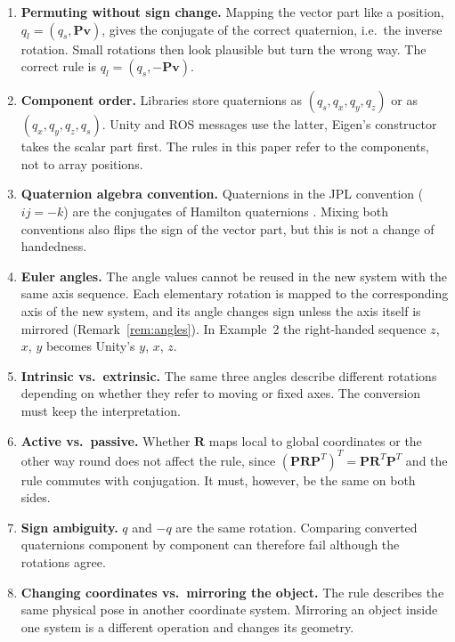 \documentclass{article}
\theoremstyle{plain}
\theoremstyle{definition}
\newcommand{\vect}[1]{\boldsymbol{#1}}
\begin{document}
\begin{enumerate}
  \item \textbf{Permuting without sign change.} Mapping the vector part like a position,
        $q_l = (q_s, \vect P\vect v)$, gives the conjugate of the correct quaternion, i.e.\ the
        inverse rotation. Small rotations then look plausible but turn the wrong way. The correct
        rule is $q_l = (q_s, -\vect P\vect v)$.
  \item \textbf{Component order.} Libraries store quaternions as $(q_s, q_x, q_y, q_z)$ or as
        $(q_x, q_y, q_z, q_s)$. Unity and ROS messages use the latter, Eigen's constructor takes the
        scalar part first. The rules in this paper refer to the components, not to array positions.
  \item \textbf{Quaternion algebra convention.} Quaternions in the JPL convention ($ij = -k$) are
        the conjugates of Hamilton quaternions \cite{sola2017, sommer2018}. Mixing both conventions
        also flips the sign of the vector part, but this is not a change of handedness.
  \item \textbf{Euler angles.} The angle values cannot be reused in the new system with the same
        axis sequence. Each elementary rotation is mapped to the corresponding axis of the new
        system, and its angle changes sign unless the axis itself is mirrored
        (Remark~\ref{rem:angles}). In Example~2 the right-handed sequence $z$, $x$, $y$ becomes
        Unity's $y$, $x$, $z$.
  \item \textbf{Intrinsic vs.\ extrinsic.} The same three angles describe different rotations
        depending on whether they refer to moving or fixed axes. The conversion must keep the
        interpretation.
  \item \textbf{Active vs.\ passive.} Whether $\vect R$ maps local to global coordinates or the
        other way round does not affect the rule, since $(\vect P \vect R \vect P^T)^T =
        \vect P \vect R^T \vect P^T$ and the rule commutes with conjugation. It must, however, be
        the same on both sides.
  \item \textbf{Sign ambiguity.} $q$ and $-q$ are the same rotation. Comparing converted quaternions
        component by component can therefore fail although the rotations agree.
  \item \textbf{Changing coordinates vs.\ mirroring the object.} The rule describes the same physical
        pose in another coordinate system. Mirroring an object inside one system is a different
        operation and changes its geometry.
\end{enumerate}
\end{document}
